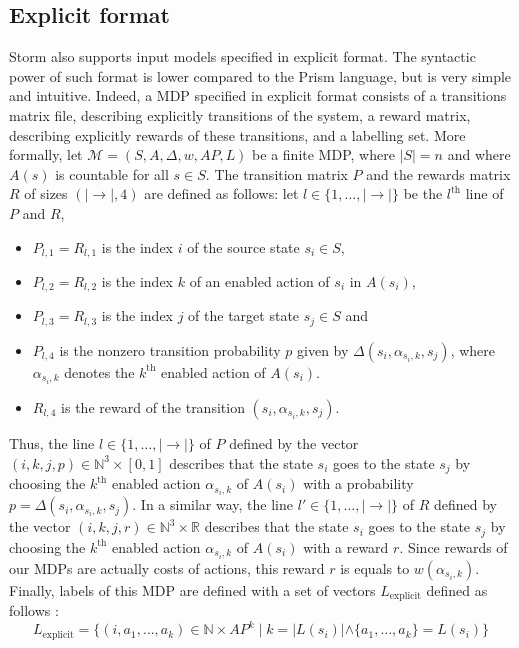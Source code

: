 \subsection{Explicit format}
Storm also supports input models specified in explicit format. The syntactic power of such format is lower compared to the Prism language, but is
very simple and intuitive. Indeed, a MDP specified in explicit format
consists of a transitions matrix file, describing explicitly transitions of the system, a reward matrix, describing explicitly
rewards of these transitions, and a labelling set. More formally, let $\mathcal{M} = (S, A, \Delta, w, AP, L)$ be a finite MDP, where $|S| = n$ and where $A(s)$ is countable for all $s \in S$. The transition matrix $P$ and the rewards matrix $R$ of sizes $(|\rightarrow|, 4)$ are defined as follows:
let $l \in \{1, \dots, |\rightarrow|\}$ be the $l^\text{th}$ line of $P$ and $R$,
\begin{itemize}
  \item $P_{l, 1} = R_{l, 1}$ is the index $i$ of the source state $s_i \in S$,
  \item $P_{l, 2} = R_{l, 2}$ is the index $k$ of an enabled action of $s_i$ in $A(s_i)$,
  \item $P_{l, 3} = R_{l, 3}$ is the index $j$ of the target state $s_j \in S$ and
  \item $P_{l, 4}$ is the nonzero transition probability $p$ given by $\Delta(s_i, \alpha_{s_i, k}, s_j)$, where $\alpha_{s_i, k}$ denotes the $k^\text{th}$ enabled action of $A(s_i)$.
  \item $R_{l, 4}$ is the reward of the transition $(s_i, \alpha_{s_i, k}, s_j)$.
\end{itemize}
Thus, the line $l \in \{1, \dots, |\rightarrow|\}$ of $P$ defined by the vector $(i, k, j, p) \in \mathbb{N}^3
\times [0, 1]$ describes that the state $s_i$ goes to the state $s_j$ by choosing
the $k^\text{th}$ enabled action $\alpha_{s_i, k}$ of $A(s_i)$ with a probability $p = \Delta(s_i, \alpha_{s_i, k}, s_j)$. In a similar way,
the line $l' \in \{1, \dots, |\rightarrow|\}$ of $R$ defined by the vector
$(i, k, j, r) \in \mathbb{N}^3 \times \mathbb{R}$ describes that the state $s_i$ goes to the state $s_j$ by choosing the $k^\text{th}$ enabled action $\alpha_{s_i, k}$ of $A(s_i)$ with a reward $r$.
Since rewards of our MDPs are actually costs of actions, this reward $r$ is equals to $w(\alpha_{s_i, k})$. \\

Finally, labels of this MDP are defined with a set of vectors $L_\text{explicit}$ defined as follows : \[L_\text{explicit} = \{(i, a_1, \dots, a_k) \in \mathbb{N} \times AP^k \; | \; k = |L(s_i)| \wedge \{a_1, \dots, a_k\} = L(s_i)\}\]

